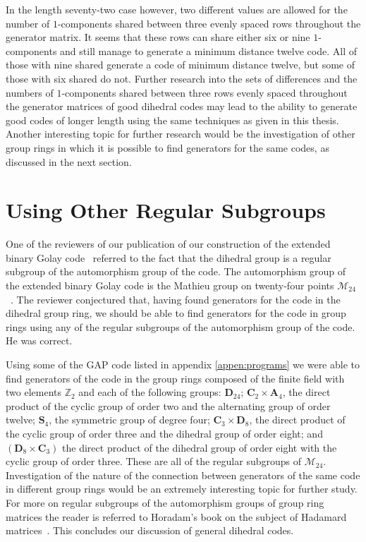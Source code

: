 In the length seventy-two case however, two different values are allowed for the number of $1$-components shared between three evenly spaced rows throughout the generator matrix.
It seems that these rows can share either six or nine $1$-components and still manage to generate a minimum distance twelve code.
All of those with nine shared generate a code of minimum distance twelve, but some of those with six shared do not.
Further research into the sets of differences and the numbers of $1$-components shared between three rows evenly spaced throughout the generator matrices of good dihedral codes may lead to the ability to generate good codes of longer length using the same techniques as given in this thesis.
Another interesting topic for further research would be the investigation of other group rings in which it is possible to find generators for the same codes, as discussed in the next section.

\section{Using Other Regular Subgroups}
\label{sect:otherregsubgroups}
One of the reviewers of our publication of our construction of the extended binary Golay code~\cite{mcl08} referred to the fact that the dihedral group is a regular subgroup of the automorphism group of the code.
The automorphism group of the extended binary Golay code is the Mathieu group on twenty-four points $\mathcal{M}_{24}$~\cite[p.~251]{huf03}.
The reviewer conjectured that, having found generators for the code in the dihedral group ring, we should be able to find generators for the code in group rings using any of the regular subgroups of the automorphism group of the code.
He was correct.

Using some of the GAP code listed in appendix \ref{appen:programs} we were able to find generators of the code in the group rings composed of the finite field with two elements $\mathbb{Z}_2$ and each of the following groups: $\mathbf{D}_{24}$; $\mathbf{C}_2 \times \mathbf{A}_4$, the direct product of the cyclic group of order two and the alternating group of order twelve; $\mathbf{S}_4$, the symmetric group of degree four; $\mathbf{C}_3 \times \mathbf{D}_8$, the direct product of the cyclic group of order three and the dihedral group of order eight; and $( \mathbf{D}_8 \times \mathbf{C}_3) $ the direct product of the dihedral group of order eight with the cyclic group of order three.
These are all of the regular subgroups of $\mathcal{M}_{24}$.
Investigation of the nature of the connection between generators of the same code in different group rings would be an extremely interesting topic for further study.
For more on regular subgroups of the automorphism groups of group ring matrices the reader is referred to Horadam's book on the subject of Hadamard matrices~\cite{hor07}.
This concludes our discussion of general dihedral codes.